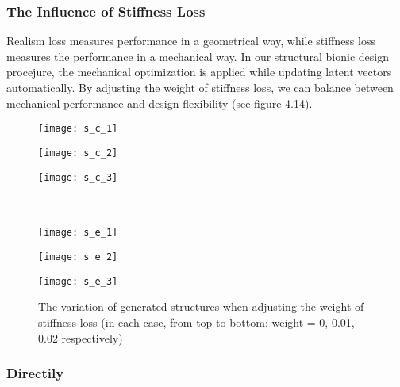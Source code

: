 \subsubsection{The Influence of Stiffness Loss}
Realism loss measures performance in a geometrical way, while stiffness loss measures the performance in a mechanical way. In our structural bionic design procejure, the mechanical optimization is applied while updating latent vectors automatically. By adjusting the weight of stiffness loss, we can balance between mechanical performance and design flexibility (see figure 4.14).

\begin{figure}
	\centering

		\begin{minipage}[b]{0.8\textwidth}
			\texttt{[image: s\_c\_1]}
		\end{minipage}

		\begin{minipage}[b]{0.8\textwidth}
			\texttt{[image: s\_c\_2]}
		\end{minipage}

		\begin{minipage}[b]{0.8\textwidth}
			\texttt{[image: s\_c\_3]}\\\\\\
		\end{minipage}

		\begin{minipage}[b]{0.8\textwidth}
			\texttt{[image: s\_e\_1]}
		\end{minipage}

		\begin{minipage}[b]{0.8\textwidth}
			\texttt{[image: s\_e\_2]}
		\end{minipage}

		\begin{minipage}[b]{0.8\textwidth}
			\texttt{[image: s\_e\_3]}
		\end{minipage}

	\caption{The variation of generated structures when adjusting the weight of stiffness loss (in each case, from top to bottom: weight = 0, 0.01, 0.02 respectively)} \label{fig:24}
\end{figure}

\subsubsection{Directily }

